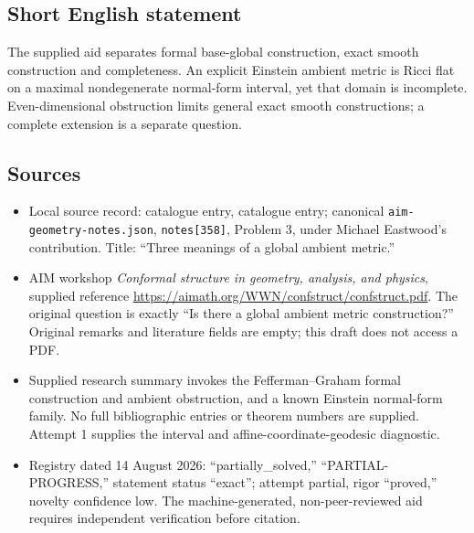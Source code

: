 \documentclass[11pt]{article}
\begin{document}
\subsection{Short English statement}
The supplied aid separates formal base-global construction, exact smooth construction and completeness. An explicit Einstein ambient metric is Ricci flat on a maximal nondegenerate normal-form interval, yet that domain is incomplete. Even-dimensional obstruction limits general exact smooth constructions; a complete extension is a separate question.
\subsection{Sources}
\begin{itemize}
\item Local source record: catalogue entry, catalogue entry; canonical \texttt{aim-geometry-notes.json}, \texttt{notes[358]}, Problem 3, under Michael Eastwood's contribution. Title: ``Three meanings of a global ambient metric.''
\item AIM workshop \emph{Conformal structure in geometry, analysis, and physics}, supplied reference \url{https://aimath.org/WWN/confstruct/confstruct.pdf}. The original question is exactly ``Is there a global ambient metric construction?'' Original remarks and literature fields are empty; this draft does not access a PDF.
\item Supplied research summary invokes the Fefferman--Graham formal construction and ambient obstruction, and a known Einstein normal-form family. No full bibliographic entries or theorem numbers are supplied. Attempt 1 supplies the interval and affine-coordinate-geodesic diagnostic.
\item Registry dated 14 August 2026: ``partially\_solved,'' ``PARTIAL-PROGRESS,'' statement status ``exact''; attempt partial, rigor ``proved,'' novelty confidence low. The machine-generated, non-peer-reviewed aid requires independent verification before citation.
\end{itemize}
\end{document}
